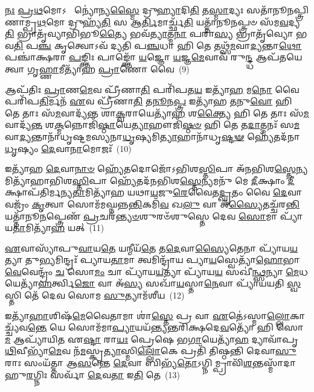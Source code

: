 \-\ul{𑌨𑌃} \ul{𑌪𑍍𑌰}\-\-\ul{𑌥}\-𑌮𑍋\-𑌽  𑌨𑍍𑌯𑍋॑𑌨𑍍𑌯\-\ul{𑌸𑍍𑌮𑍈} 𑌦𑍍𑌰𑍁\-\ul{𑌹𑍍𑌯𑌾}\-𑌦𑌿\-\ul{𑌤𑌿} 𑌤\-\ul{𑌸𑍍𑌮𑌾}\-𑌦𑍍𑌯𑌃 𑌸𑌤𑌾᳴𑌨𑍂𑌨𑌪𑍍𑌤𑍍𑌰𑌿𑌣𑌾𑌮𑍍𑌪𑍍𑌰\-\ul{𑌥}\-𑌮𑍋 𑌦𑍍𑌰𑍁𑌹𑍍𑌯᳴\-\ul{𑌤𑌿} 𑌸 𑌆\-\ul{𑌰𑍍𑌤𑌿}\-𑌮𑌾𑌰𑍍𑌚𑍍𑌛᳴\-\ul{𑌤𑌿} 𑌯𑌤𑍍𑌤𑌾᳴𑌨𑍂\-\ul{𑌨}\-𑌪𑍍𑌤𑍍𑌰𑍞 𑌸᳴𑌮\-\ul{𑌵}\-𑌦𑍍𑌯\-\ul{𑌤𑌿} 𑌭𑍍𑌰𑌾𑌤𑍃᳴𑌵𑍍𑌯𑌾𑌭𑌿𑌭𑍂\-\ul{𑌤𑍍𑌯𑍈} 𑌭𑌵᳴\-\ul{𑌤𑍍𑌯𑌾}\-𑌤𑍍𑌮\-\ul{𑌨𑌾} 𑌪𑌰𑌾॑\-\ul{𑌸𑍍𑌯} 𑌭𑍍𑌰𑌾𑌤𑍃᳴𑌵𑍍𑌯𑍋 𑌭𑌵\-\ul{𑌤𑌿} 𑌪\-\ul{𑌞𑍍𑌚} 𑌕𑍃𑌤𑍍𑌵𑍋\-𑌽𑌵᳴ 𑌦𑍍𑌯𑌤𑌿 𑌪\-\ul{𑌞𑍍𑌚}\-𑌧𑌾 𑌹𑌿 𑌤𑍇 𑌤𑌥𑍍𑌸᳴\-\ul{𑌮}\-𑌵𑌾\-\ul{𑌦𑍍𑌯}\-𑌨𑍍𑌤𑌾\-\ul{𑌥𑍋} 𑌪𑌞𑍍𑌚𑌾॑𑌕𑍍𑌷𑌰𑌾 \ul{𑌪}\-𑌙𑍍𑌕𑍍𑌤𑌿𑌃 𑌪𑌾𑌙𑍍𑌕𑍍𑌤𑍋᳴ \ul{𑌯}\-𑌜𑍍𑌞𑍋 \ul{𑌯}\-𑌜𑍍𑌞\-\ul{𑌮𑍇}\-𑌵𑌾𑌵᳴ 𑌰𑍁\-\ul{𑌨𑍍𑌦𑍍𑌧} 𑌆𑌪᳴𑌤𑌯𑍇 𑌤𑍍𑌵𑌾 𑌗𑍃\-\ul{𑌹𑍍𑌣𑌾}\-𑌮𑍀𑌤𑍍𑌯𑌾᳴𑌹 \ul{𑌪𑍍𑌰𑌾}\-𑌣𑍋 𑌵𑍈~(9)

𑌆𑌪᳴𑌤𑌿𑌃 \ul{𑌪𑍍𑌰𑌾}\-𑌣\-\ul{𑌮𑍇}\-𑌵 𑌪𑍍𑌰𑍀᳴𑌣𑌾\-\ul{𑌤𑌿} 𑌪𑌰𑌿᳴𑌪𑌤\-\ul{𑌯} 𑌇𑌤𑍍𑌯𑌾᳴\-\ul{𑌹} 𑌮\-\ul{𑌨𑍋} 𑌵𑍈 𑌪𑌰𑌿᳴𑌪\-\ul{𑌤𑌿}\-𑌰𑍍𑌮𑌨᳴ \ul{𑌏}\-𑌵 𑌪𑍍𑌰𑍀᳴𑌣𑌾\-\ul{𑌤𑌿} 𑌤\-\ul{𑌨𑍂}\-𑌨\-\ul{𑌪𑍍𑌤𑍍𑌰} 𑌇𑌤𑍍𑌯𑌾᳴𑌹 \ul{𑌤}\-𑌨𑍁\-\ul{𑌵𑍋} 𑌹𑌿 𑌤𑍇 𑌤𑌾𑌃 𑌸᳴\-\ul{𑌮}\-𑌵𑌾𑌦𑍍𑌯᳴𑌨𑍍𑌤 𑌶𑌾\-\ul{𑌕𑍍𑌵}\-𑌰𑌾𑌯𑍇𑌤𑍍𑌯𑌾᳴\-\ul{𑌹} 𑌶\-\ul{𑌕𑍍𑌤𑍍𑌯𑍈} 𑌹𑌿 𑌤𑍇 𑌤𑌾𑌃 𑌸᳴\-\ul{𑌮}\-𑌵𑌾𑌦𑍍𑌯᳴\-\ul{𑌨𑍍𑌤} 𑌶\-\ul{𑌕𑍍𑌮}\-𑌨𑍍𑌨𑍋𑌜𑌿᳴\-\ul{𑌷𑍍𑌠𑌾}\-𑌯𑍇\-\ul{𑌤𑍍𑌯𑌾}\-𑌹𑍗𑌜𑌿᳴\-\ul{𑌷𑍍𑌠}\-\-\ul{𑍞} 𑌹𑌿 𑌤𑍇 𑌤\-\ul{𑌦𑌾}\-𑌤𑍍𑌮𑌨𑌃᳴ 𑌸\-\ul{𑌮}\-𑌵𑌾\-\ul{𑌦𑍍𑌯}\-𑌨𑍍𑌤𑌾𑌨𑌾᳴𑌧𑍃𑌷𑍍𑌟𑌮𑌸𑍍𑌯𑌨𑌾\-\ul{𑌧𑍃}\-𑌷𑍍𑌯𑌮𑌿\-\ul{𑌤𑍍𑌯𑌾}\-𑌹𑌾𑌨𑌾᳴𑌧𑍃\-\ul{𑌷𑍍𑌟}\-\-\ul{𑍟} 𑌹𑍍𑌯𑍇᳴𑌤𑌦᳴𑌨𑌾\-\ul{𑌧𑍃}\-𑌷𑍍𑌯𑌂 \ul{𑌦𑍇}\-𑌵𑌾\-\ul{𑌨𑌾}\-𑌮𑍋𑌜𑌃᳴~(10)

𑌇𑌤𑍍𑌯𑌾᳴𑌹 \ul{𑌦𑍇}\-𑌵𑌾\-\ul{𑌨𑌾}\-\-\ul{𑍞} 𑌹𑍍𑌯𑍇᳴𑌤𑌦𑍋𑌜𑍋᳴\-𑌽𑌭𑌿𑌶\-\ul{𑌸𑍍𑌤𑌿}\-𑌪𑌾 𑌅᳴𑌨𑌭𑌿𑌶\-\ul{𑌸𑍍𑌤𑍇}\-𑌨𑍍𑌯𑌮𑌿𑌤𑍍𑌯𑌾᳴𑌹𑌾𑌭𑌿𑌶\-\ul{𑌸𑍍𑌤𑌿}\-𑌪𑌾 𑌹𑍍𑌯𑍇᳴𑌤𑌦᳴𑌨𑌭𑌿𑌶\-\ul{𑌸𑍍𑌤𑍇}\-𑌨𑍍𑌯𑌮𑌨𑍁᳴ 𑌮𑍇 \ul{𑌦𑍀}\-𑌕𑍍𑌷𑌾𑌂 \ul{𑌦𑍀}\-𑌕𑍍𑌷𑌾𑌪᳴𑌤𑌿𑌰𑍍𑌮𑌨𑍍𑌯\-\ul{𑌤𑌾}\-𑌮𑌿𑌤𑍍𑌯𑌾᳴𑌹 𑌯𑌥𑌾\-\ul{𑌯}\-𑌜𑍁\-\ul{𑌰𑍇}\-𑌵𑍈𑌤\-\ul{𑌦𑍍𑌘𑍃}\-𑌤𑌂 𑌵𑍈 \ul{𑌦𑍇}\-𑌵𑌾 𑌵𑌜𑍍𑌰𑌂᳴ \ul{𑌕𑍃}\-𑌤𑍍𑌵𑌾 𑌸𑍋𑌮᳴𑌮𑌘𑍍𑌨𑌨𑍍𑌨\-\ul{𑌨𑍍𑌤𑌿}\-𑌕𑌮𑌿᳴\-\ul{𑌵} 𑌖\-\ul{𑌲𑍁} 𑌵𑌾 𑌅᳴\-\ul{𑌸𑍍𑌯𑍈}\-𑌤𑌚𑍍𑌚᳴𑌰\-\ul{𑌨𑍍𑌤𑌿} 𑌯𑌤𑍍𑌤𑌾᳴𑌨𑍂\-\ul{𑌨}\-𑌪𑍍𑌤𑍍𑌰𑍇𑌣᳴ \ul{𑌪𑍍𑌰}\-𑌚𑌰᳴\-\ul{𑌨𑍍𑌤𑍍𑌯}\-\-\ul{𑍞}\-𑌶𑍁𑌰𑍞᳴𑌶𑍁𑌸𑍍𑌤𑍇 𑌦𑍇𑌵 \ul{𑌸𑍋}\-𑌮𑌾 𑌪𑍍𑌯𑌾᳴𑌯\-\ul{𑌤𑌾}\-𑌮𑌿𑌤𑍍𑌯𑌾᳴\-\ul{𑌹} 𑌯𑌤𑍍~(11)

\-\ul{𑌏}\-𑌵𑌾𑌸𑍍𑌯𑌾᳴𑌪𑍁\-\ul{𑌵𑌾}\-𑌯\-\ul{𑌤𑍇} 𑌯𑌨𑍍𑌮𑍀𑌯᳴\-\ul{𑌤𑍇} 𑌤\-\ul{𑌦𑍇}\-𑌵𑌾\-\ul{𑌸𑍍𑌯𑍈}\-𑌤𑍇𑌨𑌾 𑌪𑍍𑌯𑌾᳴𑌯\-\ul{𑌯}\-𑌤𑍍𑌯𑌾 𑌤𑍁\-\ul{𑌭𑍍𑌯}\-𑌮𑌿𑌨𑍍𑌦𑍍𑌰𑌃᳴ 𑌪𑍍𑌯𑌾𑌯\-\ul{𑌤𑌾}\-𑌮𑌾 𑌤𑍍𑌵𑌮𑌿𑌨𑍍𑌦𑍍𑌰𑌾᳴𑌯 𑌪𑍍𑌯𑌾\-\ul{𑌯}\-𑌸𑍍𑌵𑍇𑌤𑍍𑌯𑌾᳴\-\ul{𑌹𑍋}\-𑌭𑌾\-\ul{𑌵𑍇}\-𑌵𑍇𑌨𑍍𑌦𑍍𑌰𑌂᳴ \ul{𑌚} 𑌸𑍋\-\ul{𑌮𑌂} 𑌚𑌾 𑌪𑍍𑌯𑌾᳴𑌯\-\ul{𑌯}\-𑌤𑍍𑌯𑌾 𑌪𑍍𑌯𑌾᳴𑌯\-\ul{𑌯} 𑌸𑌖𑍀॑\-\ul{𑌨𑍍𑌥𑍍𑌸}\-𑌨𑍍𑌯𑌾 \ul{𑌮𑍇}\-𑌧𑌯𑍇𑌤𑍍𑌯𑌾᳴\-\ul{𑌹}\-𑌰𑍍𑌤𑍍𑌵𑌿\-\ul{𑌜𑍋} 𑌵𑌾 𑌅᳴\-\ul{𑌸𑍍𑌯} 𑌸𑌖𑌾᳴\-\ul{𑌯}\-𑌸𑍍𑌤𑌾\-\ul{𑌨𑍇}\-𑌵𑌾 𑌪𑍍𑌯𑌾᳴𑌯𑌯𑌤𑌿 \ul{𑌸𑍍𑌵}\-𑌸𑍍𑌤𑌿 𑌤𑍇᳴ 𑌦𑍇𑌵 𑌸𑍋𑌮 \ul{𑌸𑍁}\-𑌤𑍍𑌯𑌾𑌮᳴𑌶𑍀𑌯~(12)

𑌇𑌤𑍍𑌯𑌾᳴\-\ul{𑌹𑌾}\-𑌶𑌿𑌷᳴\-\ul{𑌮𑍇}\-𑌵𑍈𑌤𑌾𑌮𑌾 𑌶𑌾॑\-\ul{𑌸𑍍𑌤𑍇} 𑌪𑍍𑌰 𑌵𑌾 \ul{𑌏}\-𑌤𑍇॑\-𑌽𑌸𑍍𑌮𑌾\-\ul{𑌲𑍍𑌲𑍋}\-𑌕𑌾𑌚𑍍𑌚𑍍𑌯᳴𑌵\-\ul{𑌨𑍍𑌤𑍇} 𑌯𑍇 𑌸𑍋𑌮᳴𑌮𑌾\-\ul{𑌪𑍍𑌯𑌾}\-𑌯𑌯᳴𑌨𑍍𑌤𑍍𑌯𑌨𑍍𑌤𑌰𑌿𑌕𑍍𑌷𑌦𑍇\-\ul{𑌵}\-𑌤𑍍𑌯𑍋᳴ 𑌹𑌿 𑌸𑍋\-\ul{𑌮} 𑌆𑌪𑍍𑌯𑌾᳴𑌯𑌿\-\ul{𑌤} 𑌏\-\ul{𑌷𑍍𑌟𑌾} 𑌰𑌾\-\ul{𑌯𑌃} 𑌪𑍍𑌰𑍇𑌷𑍇 𑌭\-\ul{𑌗𑌾}\-𑌯𑍇𑌤𑍍𑌯𑌾᳴\-\ul{𑌹} 𑌦𑍍𑌯𑌾𑌵𑌾᳴𑌪𑍃\-\ul{𑌥𑌿}\-𑌵𑍀𑌭𑍍𑌯𑌾᳴\-\ul{𑌮𑍇}\-𑌵 𑌨᳴\-\ul{𑌮}\-𑌸𑍍𑌕𑍃\-\ul{𑌤𑍍𑌯𑌾}\-𑌸𑍍𑌮𑌿\-\ul{𑌲𑍍𑌲𑍋𑌁}\-𑌕𑍇 𑌪𑍍𑌰𑌤𑌿᳴ 𑌤𑌿𑌷𑍍𑌠𑌨𑍍𑌤𑌿 𑌦𑍇𑌵𑌾\-\ul{𑌸𑍁}\-𑌰𑌾𑌃 𑌸𑌂𑌯᳴𑌤𑍍𑌤𑌾 𑌆\-\ul{𑌸}\-𑌨𑍍𑌤𑍇 \ul{𑌦𑍇}\-𑌵𑌾 𑌬𑌿𑌭𑍍𑌯᳴\-\ul{𑌤𑍋}\-\-𑌽𑌗𑍍𑌨𑌿𑌮𑍍𑌪𑍍𑌰𑌾𑌵𑌿᳴\-\ul{𑌶}\-𑌨𑍍𑌤𑌸𑍍𑌮𑌾᳴𑌦𑌾𑌹𑍁\-\ul{𑌰}\-𑌗𑍍𑌨𑌿𑌃 𑌸𑌰𑍍𑌵𑌾᳴ \ul{𑌦𑍇}\-𑌵\-\ul{𑌤𑌾} 𑌇\-\ul{𑌤𑌿} 𑌤𑍇~(13)

